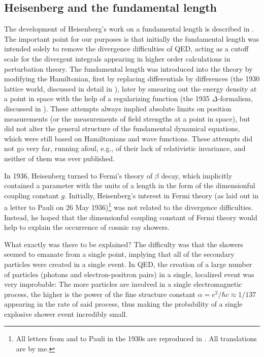 \documentclass[12pt,a4paper]{article}
\begin{document}
\subsection{Heisenberg and the fundamental length}

The development of Heisenberg's work on a fundamental length is described in  \citep{kragh_1995_arthur}. The important point for our purposes is that initially the fundamental length was intended solely to remove the divergence difficulties of  QED, acting as a cutoff scale for the divergent integrals appearing in higher order calculations in perturbation theory. The fundamental length was introduced into the theory by modifying the Hamiltonian, first by replacing differentials by differences (the 1930 lattice world, discussed in detail in \citep{carazza_1995_heisenbergs}), later by smearing out the energy density at a point in space with the help of a regularizing function (the 1935 $\Delta$-formalism, discussed in \citep{miller_1994_early}). These attempts always implied absolute limits on position measurements (or the measurements of field strengths at a point in space), but did not alter the general structure of the fundamental dynamical equations, which were still based on Hamiltonians and wave functions. These attempts did not go very far, running afoul, e.g., of their lack of relativistic invariance, and neither of them was ever published.

In 1936, Heisenberg turned to Fermi's theory of $\beta$ decay, which implicitly contained a parameter with the units of a length in the form of the dimensionful coupling constant $g$. Initially, Heisenberg's interest in Fermi theory (as laid out in a letter to Pauli on 26 May 1936)\footnote{All letters from and to Pauli in the 1930s are reproduced in \citep{hermann_1985_wissenschaftlicher}. All translations are by me.} was not related to the divergence difficulties. Instead, he hoped that the dimensionful coupling constant of Fermi theory would help to explain the occurrence of cosmic ray showers. 

What exactly was there to be explained? The difficulty was that the showers seemed to emanate from a single point, implying that all of the secondary particles were created in a single event. In QED, the creation of a large number of particles (photons and electron-positron pairs) in a single, localized event was very improbable: The more particles are involved in a single electromagnetic process, the higher is the power of the fine structure constant $\alpha = e^2/\hbar c \approx 1/137$ appearing in the rate of said process, thus making the probability of a single explosive shower event incredibly small. 
\end{document}
